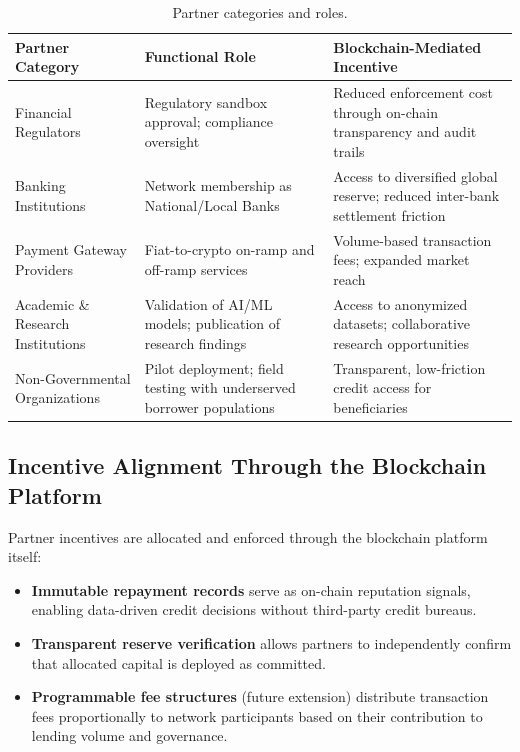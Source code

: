 \documentclass[11pt,a4paper]{article}
\newcommand{\tableheadfont}{\bfseries\small\color{PrimaryBlue}}
\newenvironment{moderntable}[1][H]{%
    \begin{table}[#1]\centering\small%
    \renewcommand{\arraystretch}{1.35}%
}{%
    \end{table}%
}
\begin{document}
\begin{moderntable}
\caption{Partner categories and roles.}
\begin{tabular}{@{} >{\raggedright}p{3.2cm} >{\raggedright}p{4.2cm} >{\raggedright\arraybackslash}p{4.6cm} @{}}
\toprule
\tableheadfont Partner Category & \tableheadfont Functional Role & \tableheadfont Blockchain-Mediated Incentive \\
\midrule
\rowcolor{RowShade}
Financial Regulators & Regulatory sandbox approval; compliance oversight & Reduced enforcement cost through on-chain transparency and audit trails \\
Banking Institutions & Network membership as National/Local Banks & Access to diversified global reserve; reduced inter-bank settlement friction \\
\rowcolor{RowShade}
Payment Gateway Providers & Fiat-to-crypto on-ramp and off-ramp services & Volume-based transaction fees; expanded market reach \\
Academic \& Research Institutions & Validation of AI/ML models; publication of research findings & Access to anonymized datasets; collaborative research opportunities \\
\rowcolor{RowShade}
Non-Governmental Organizations & Pilot deployment; field testing with underserved borrower populations & Transparent, low-friction credit access for beneficiaries \\
\bottomrule
\end{tabular}
\end{moderntable}

\subsection{Incentive Alignment Through the Blockchain Platform}

Partner incentives are allocated and enforced through the blockchain platform itself:

\begin{itemize}[noitemsep]
\item \textbf{Immutable repayment records} serve as on-chain reputation signals, enabling data-driven credit decisions without third-party credit bureaus.
\item \textbf{Transparent reserve verification} allows partners to independently confirm that allocated capital is deployed as committed.
\item \textbf{Programmable fee structures} (future extension) distribute transaction fees proportionally to network participants based on their contribution to lending volume and governance.
\end{itemize}
\end{document}
